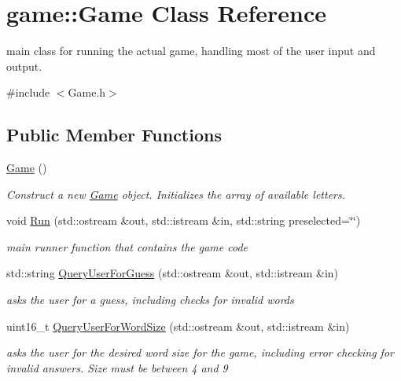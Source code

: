 \hypertarget{classgame_1_1Game}{}\section{game\+:\+:Game Class Reference}
\label{classgame_1_1Game}


main class for running the actual game, handling most of the user input and output.  




{\ttfamily \#include $<$Game.\+h$>$}

\subsection*{Public Member Functions}
\begin{DoxyCompactItemize}
\item 
\mbox{\label{classgame_1_1Game_a74cd9697144c5bb5ccf1d2cb71d56e41}} 
\hyperlink{classgame_1_1Game_a74cd9697144c5bb5ccf1d2cb71d56e41}{Game} ()
\begin{DoxyCompactList}\small\item\em Construct a new \hyperlink{classgame_1_1Game}{Game} object. Initializes the array of available letters. \end{DoxyCompactList}\item 
void \hyperlink{classgame_1_1Game_afbb584718c566dd27f6e2d8fe0085d8c}{Run} (std\+::ostream \&out, std\+::istream \&in, std\+::string preselected=\char`\"{}\char`\"{})
\begin{DoxyCompactList}\small\item\em main runner function that contains the game code \end{DoxyCompactList}\item 
std\+::string \hyperlink{classgame_1_1Game_a4a16bdf4073caea5efc9c4b70b1b969f}{Query\+User\+For\+Guess} (std\+::ostream \&out, std\+::istream \&in)
\begin{DoxyCompactList}\small\item\em asks the user for a guess, including checks for invalid words \end{DoxyCompactList}\item 
uint16\+\_\+t \hyperlink{classgame_1_1Game_a3352c8a498b17b0a374d4a696fc2abdf}{Query\+User\+For\+Word\+Size} (std\+::ostream \&out, std\+::istream \&in)
\begin{DoxyCompactList}\small\item\em asks the user for the desired word size for the game, including error checking for invalid answers. Size must be between 4 and 9 \end{DoxyCompactList}\item 

\end{DoxyCompactItemize}
